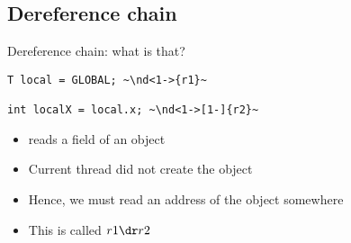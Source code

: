 %
\ifrender
\subsection{Dereference chain}
\begin{frame}[fragile]{Dereference chain: what is that?}
%
\begin{center}
\begin{minipage}[3]{.5\linewidth}
	\begin{lstlisting}
T local = GLOBAL; ~\nd<1->{r1}~

int localX = local.x; ~\nd<1->[1-]{r2}~
	\end{lstlisting}
\end{minipage}
\end{center}


%

\begin{itemize}[<+->]
\item {} reads a field of an object
\item Current thread did not create the object
\item Hence, we must read an address of the object somewhere
\item This is called $r1 \dr r2$
\end{itemize}


\end{frame}
\fi
